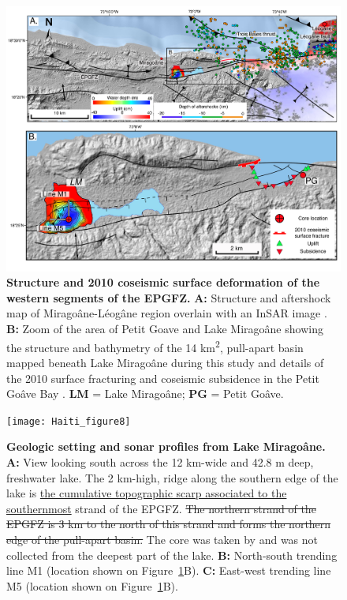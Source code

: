 \documentclass[linenumbers,draft]{agujournal}
\begin{document}
\begin{figure}
\centering
\includegraphics[width=\textwidth]{Haiti_figure7}
\caption{\textbf{Structure and 2010 coseismic surface deformation of the western segments of the EPGFZ.} \textbf{A:} Structure \underline{\citep{prentice2010seismic,cowgill2012interactive}} and aftershock \underline{\citep{douilly2013crustal}} map of Mirago\^ane-L\'eog\^ane region overlain with an InSAR image \underline{\citep{hashimoto2011fan}}. \textbf{B:} Zoom of the area of Petit Goave and Lake Mirago\^ane showing the structure and bathymetry of the 14 km\textsuperscript{2}, pull-apart basin mapped beneath Lake Mirago\^ane during this study and details of the 2010 surface fracturing and coseismic subsidence in the Petit Go\^ave Bay \citep{prentice2010seismic}. \textbf{LM} = Lake Mirago\^ane; \textbf{PG} = Petit Go\^ave.}
\label{figure7}
\end{figure}

\begin{figure}
\centering
\texttt{[image: Haiti\_figure8]}
\caption{\textbf{Geologic setting and sonar profiles from Lake Mirago\^ane.} \textbf{A:} View looking south across the 12 km-wide and 42.8 m deep, freshwater lake. The 2 km-high, ridge along the southern edge of the lake is \ul{the cumulative topographic scarp associated to the southernmost} strand of the EPGFZ. \st{The northern strand of the EPGFZ is 3 km to the north of this strand and forms the northern edge of the pull-apart basin.} The core was taken by \citet{higuera199910} and was not collected from the deepest part of the lake. \textbf{B:} North-south trending line M1 (location shown on Figure~\ref{figure7}B). \textbf{C:} East-west trending line M5 (location shown on Figure~\ref{figure7}B).}
\label{figure8}
\end{figure}
\end{document}
